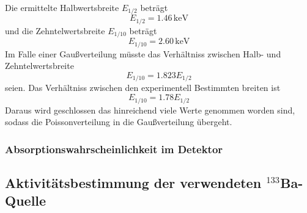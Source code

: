 Die ermittelte Halbwertsbreite $E_{1/2}$ beträgt 
\begin{equation}
  E_{1/2} = 1.46 \, \text{keV}
\end{equation}
und die Zehntelwertsbreite $E_{1/10}$ beträgt 
\begin{equation}
  E_{1/10} = 2.60 \, \text{keV}
\end{equation}
Im Falle einer Gaußverteilung müsste das Verhältniss zwischen Halb- und Zehntelwertsbreite 
\begin{equation}
  E_{1/10} = 1.823 E_{1/2}
\end{equation}
seien. Das Verhältniss zwischen den experimentell Bestimmten breiten ist
\begin{equation}
  E_{1/10} = 1.78 E_{1/2}
  \label{eqn:Ver}
\end{equation}
Daraus wird geschlossen das hinreichend viele Werte genommen worden sind, sodass die Poissonverteilung in die Gaußverteilung übergeht.

\subsubsection{Absorptionswahrscheinlichkeit im Detektor}

\subsection{Aktivitätsbestimmung der verwendeten $^{133}$Ba-Quelle}


